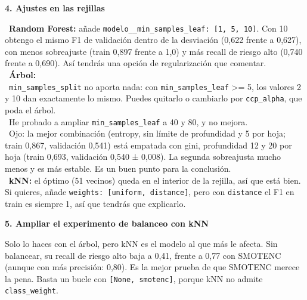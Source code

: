 \documentclass[11pt,a4paper]{article}
\begin{document}
{\smallskip\noindent\textbf{4. Ajustes en las rejillas}\par
\hspace*{1.0em}\textbullet~\textbf{Random Forest:} añade \texttt{\textquotedbl{}modelo\_\allowbreak{}\_\allowbreak{}min\_\allowbreak{}samples\_\allowbreak{}leaf\textquotedbl{}: [1, 5, 10]}. Con 10 obtengo el mismo F1 de validación dentro de la desviación (0,622 frente a 0,627), con menos sobreajuste (train 0,897 frente a 1,0) y más recall de riesgo alto (0,740 frente a 0,690). Así tendrás una opción de regularización que comentar. \\{}
\hspace*{1.0em}\textbullet~\textbf{Árbol:} \\{}
\hspace*{2.0em}\textbullet~\texttt{min\_\allowbreak{}samples\_\allowbreak{}split} no aporta nada: con \texttt{min\_\allowbreak{}samples\_\allowbreak{}leaf} \textgreater{}= 5, los valores 2 y 10 dan exactamente lo mismo. Puedes quitarlo o cambiarlo por \texttt{ccp\_\allowbreak{}alpha}, que poda el árbol. \\{}
\hspace*{2.0em}\textbullet~He probado a ampliar \texttt{min\_\allowbreak{}samples\_\allowbreak{}leaf} a 40 y 80, y no mejora. \\{}
\hspace*{2.0em}\textbullet~Ojo: la mejor combinación (entropy, sin límite de profundidad y 5 por hoja; train 0,867, validación 0,541) está empatada con gini, profundidad 12 y 20 por hoja (train 0,693, validación 0,540 ± 0,008). La segunda sobreajusta mucho menos y es más estable. Es un buen punto para la conclusión. \\{}
\hspace*{1.0em}\textbullet~\textbf{kNN:} el óptimo (51 vecinos) queda en el interior de la rejilla, así que está bien. Si quieres, añade \texttt{weights: [\textquotedbl{}uniform\textquotedbl{}, \textquotedbl{}distance\textquotedbl{}]}, pero con \texttt{distance} el F1 en train es siempre 1, así que tendrás que explicarlo.

\smallskip\noindent\textbf{5. Ampliar el experimento de balanceo con kNN}\par
Solo lo haces con el árbol, pero kNN es el modelo al que más le afecta. Sin balancear, su recall de riesgo alto baja a 0,41, frente a 0,77 con SMOTENC (aunque con más precisión: 0,80). Es la mejor prueba de que SMOTENC merece la pena. Basta un bucle con \texttt{[None, \textquotedbl{}smotenc\textquotedbl{}]}, porque kNN no admite \texttt{class\_\allowbreak{}weight}.

}
\end{document}
